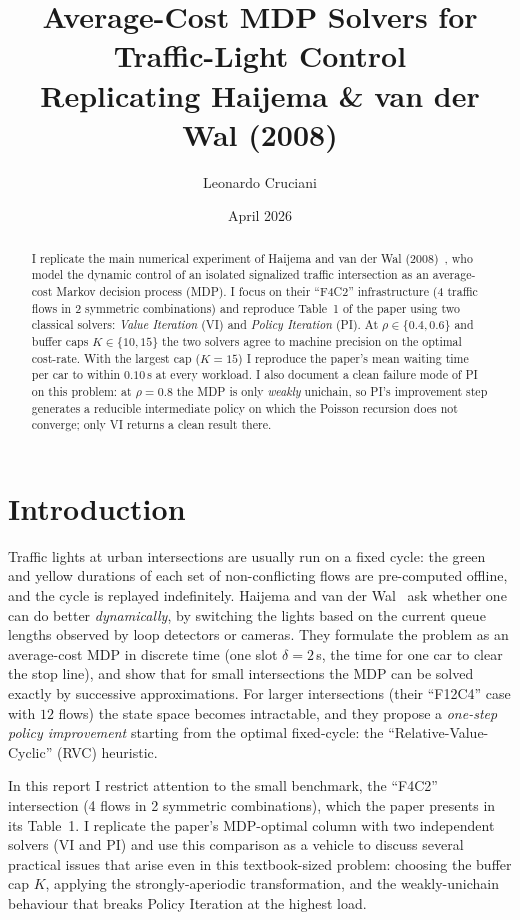 \documentclass[11pt,a4paper]{article}
\title{Average-Cost MDP Solvers for Traffic-Light Control \\[0.3em]
       \large Replicating Haijema \& van der Wal (2008)}
\author{Leonardo Cruciani}
\date{April 2026}
\begin{document}
\maketitle

\begin{abstract}
I replicate the main numerical experiment of Haijema and van der Wal
(2008)~\cite{haijema2008}, who model the dynamic control of an isolated
signalized traffic intersection as an average-cost Markov decision
process (MDP). I focus on their ``F4C2'' infrastructure (4 traffic
flows in 2 symmetric combinations) and reproduce Table~1 of the paper
using two classical solvers: \emph{Value Iteration} (VI) and
\emph{Policy Iteration} (PI). At $\rho \in \{0.4, 0.6\}$ and buffer
caps $K \in \{10, 15\}$ the two solvers agree to machine precision on
the optimal cost-rate. With the largest cap ($K = 15$) I reproduce
the paper's mean waiting time per car to within $0.10$\,s at every
workload. I also document a clean failure mode of PI on this problem:
at $\rho = 0.8$ the MDP is only \emph{weakly} unichain, so PI's
improvement step generates a reducible intermediate policy on which
the Poisson recursion does not converge; only VI returns a clean
result there.
\end{abstract}

\section{Introduction}

Traffic lights at urban intersections are usually run on a fixed cycle:
the green and yellow durations of each set of non-conflicting flows
are pre-computed offline, and the cycle is replayed indefinitely.
Haijema and van der Wal~\cite{haijema2008} ask whether one can do
better \emph{dynamically}, by switching the lights based on the
current queue lengths observed by loop detectors or cameras. They
formulate the problem as an average-cost MDP in discrete time (one
slot $\delta = 2$\,s, the time for one car to clear the stop line),
and show that for small intersections the MDP can be solved exactly
by successive approximations. For larger intersections (their
``F12C4'' case with $12$ flows) the state space becomes intractable,
and they propose a \emph{one-step policy improvement} starting from
the optimal fixed-cycle: the ``Relative-Value-Cyclic'' (RVC)
heuristic.

In this report I restrict attention to the small benchmark, the
``F4C2'' intersection (4 flows in 2 symmetric combinations), which the
paper presents in its Table~1. I replicate the paper's MDP-optimal
column with two independent solvers (VI and PI) and use this
comparison as a vehicle to discuss several practical issues that arise
even in this textbook-sized problem: choosing the buffer cap $K$,
applying the strongly-aperiodic transformation, and the
weakly-unichain behaviour that breaks Policy Iteration at the highest
load.
\end{document}
